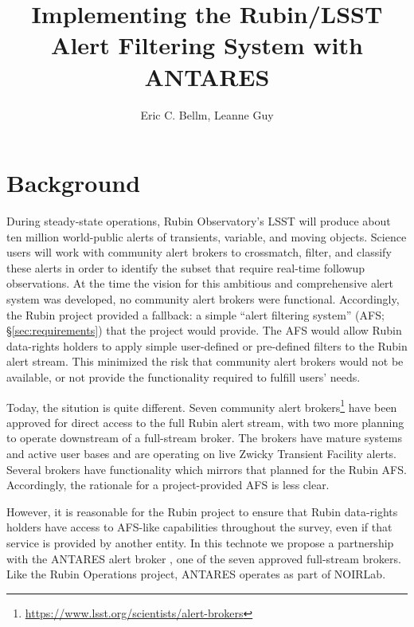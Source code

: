 \documentclass[DM,authoryear,toc]{lsstdoc}
\title{Implementing the Rubin/LSST Alert Filtering System with ANTARES}
\author{%
Eric C. Bellm, Leanne Guy
}
\date{\vcsDate}
\begin{document}
\maketitle


\section{Background}

During steady-state operations, Rubin Observatory's LSST will produce about ten million world-public alerts of transients, variable, and moving objects.
Science users will work with community alert brokers to crossmatch, filter, and classify these alerts in order to identify the subset that require real-time followup observations.
At the time the vision for this ambitious and comprehensive alert system was developed, no community alert brokers were functional.
Accordingly, the Rubin project provided a fallback: a simple ``alert filtering system'' (AFS; \S \ref{sec:requirements}) that the project would provide.
The AFS would allow Rubin data-rights holders to apply simple user-defined or pre-defined filters to the Rubin alert stream.
This minimized the risk that community alert brokers would not be available, or not provide the functionality required to fulfill users' needs.

Today, the sitution is quite different.
Seven community alert brokers\footnote{\url{https://www.lsst.org/scientists/alert-brokers}} have been approved for direct access to the full Rubin alert stream, with two more planning to operate downstream of a full-stream broker.
The brokers have mature systems and active user bases and are operating on live Zwicky Transient Facility alerts.
Several brokers have functionality which mirrors that planned for the Rubin AFS.
Accordingly, the rationale for a project-provided AFS is less clear.

However, it is reasonable for the Rubin project to ensure that Rubin data-rights holders have access to AFS-like capabilities throughout the survey, even if that service is provided by another entity.
In this technote we propose a partnership with the ANTARES alert broker \citep{2021AJ....161..107M}, one of the seven approved full-stream brokers. 
Like the Rubin Operations project, ANTARES operates as part of NOIRLab.
\end{document}

